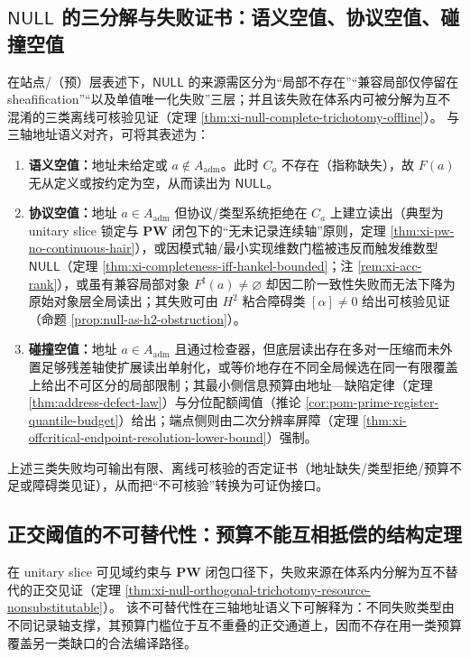 \subsection{\texorpdfstring{$\mathsf{NULL}$}{NULL} 的三分解与失败证书：语义空值、协议空值、碰撞空值}\label{subsec:cdim-null-three-way}
在站点/（预）层表述下，\(\mathsf{NULL}\) 的来源需区分为“局部不存在”“兼容局部仅停留在 sheafification”“以及单值唯一化失败”三层；并且该失败在体系内可被分解为互不混淆的三类离线可核验见证（定理 \ref{thm:xi-null-complete-trichotomy-offline}）。
与三轴地址语义对齐，可将其表述为：
\begin{enumerate}
  \item \textbf{语义空值：}地址未给定或 \(a\notin A_{\mathrm{adm}}\)。此时 \(C_a\) 不存在（指称缺失），故 \(F(a)\) 无从定义或按约定为空，从而读出为 \(\mathsf{NULL}\)。
  \item \textbf{协议空值：}地址 \(a\in A_{\mathrm{adm}}\) 但协议/类型系统拒绝在 \(C_a\) 上建立读出（典型为 unitary slice 锁定与 \(\mathbf{PW}\) 闭包下的“无未记录连续轴”原则，定理 \ref{thm:xi-pw-no-continuous-hair}），或因模式轴/最小实现维数门槛被违反而触发维数型 \(\mathsf{NULL}\)（定理 \ref{thm:xi-completeness-iff-hankel-bounded}；注 \ref{rem:xi-acc-rank}），或虽有兼容局部对象 \(F^\sharp(a)\neq\varnothing\) 却因二阶一致性失败而无法下降为原始对象层全局读出；其失败可由 \(H^2\) 粘合障碍类 \([\alpha]\neq 0\) 给出可核验见证（命题 \ref{prop:null-as-h2-obstruction}）。
  \item \textbf{碰撞空值：}地址 \(a\in A_{\mathrm{adm}}\) 且通过检查器，但底层读出存在多对一压缩而未外置足够残差轴使扩展读出单射化，或等价地存在不同全局候选在同一有限覆盖上给出不可区分的局部限制；其最小侧信息预算由地址—缺陷定律（定理 \ref{thm:address-defect-law}）与分位配额阈值（推论 \ref{cor:pom-prime-register-quantile-budget}）给出；端点侧则由二次分辨率屏障（定理 \ref{thm:xi-offcritical-endpoint-resolution-lower-bound}）强制。
\end{enumerate}
上述三类失败均可输出有限、离线可核验的否定证书（地址缺失/类型拒绝/预算不足或障碍类见证），从而把“不可核验”转换为可证伪接口。

\subsection{正交阈值的不可替代性：预算不能互相抵偿的结构定理}\label{subsec:cdim-orthogonal-threshold-nonsubstitutable}
在 unitary slice 可见域约束与 \(\mathbf{PW}\) 闭包口径下，失败来源在体系内分解为互不替代的正交见证（定理 \ref{thm:xi-null-orthogonal-trichotomy-resource-nonsubstitutable}）。
该不可替代性在三轴地址语义下可解释为：不同失败类型由不同记录轴支撑，其预算门槛位于互不重叠的正交通道上，因而不存在用一类预算覆盖另一类缺口的合法编译路径。

